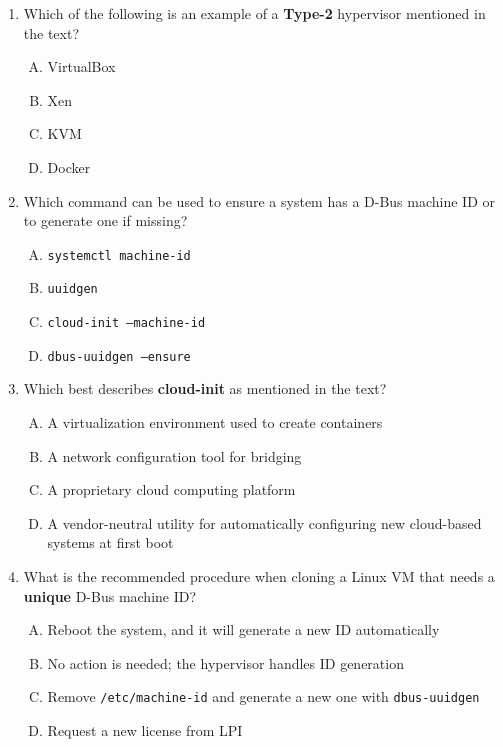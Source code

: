 \documentclass[a4paper]{report}
\begin{document}
\begin{enumerate}[1.]
    \item Which of the following is an example of a \textbf{Type-2} hypervisor mentioned in the text?  
    \begin{enumerate}[A)]
        \item VirtualBox  
        \item Xen  
        \item KVM  
        \item Docker  
    \end{enumerate}

    \item Which command can be used to ensure a system has a D-Bus machine ID or to generate one if missing?  
    \begin{enumerate}[A)]
        \item \texttt{systemctl machine-id}  
        \item \texttt{uuidgen}  
        \item \texttt{cloud-init --machine-id}  
        \item \texttt{dbus-uuidgen --ensure}  
    \end{enumerate}

    \item Which best describes \textbf{cloud-init} as mentioned in the text?  
    \begin{enumerate}[A)]
        \item A virtualization environment used to create containers  
        \item A network configuration tool for bridging  
        \item A proprietary cloud computing platform  
        \item A vendor-neutral utility for automatically configuring new cloud-based systems at first boot  
    \end{enumerate}

    \item What is the recommended procedure when cloning a Linux VM that needs a \textbf{unique} D-Bus machine ID?  
    \begin{enumerate}[A)]
        \item Reboot the system, and it will generate a new ID automatically  
        \item No action is needed; the hypervisor handles ID generation  
        \item Remove \texttt{/etc/machine-id} and generate a new one with \texttt{dbus-uuidgen}  
        \item Request a new license from LPI  
    \end{enumerate}


\end{enumerate}
\end{document}
